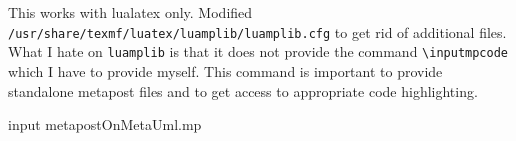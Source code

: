 \documentclass{article}
\newcommand*\inputmpcode[1]{\begin{mplibcode}input #1.mp\end{mplibcode}}
\begin{document}
This works with lualatex only. 
Modified \texttt{/usr/share/texmf/luatex/luamplib/luamplib.cfg} 
to get rid of additional files. 
What I hate on \texttt{luamplib} is that it does not provide the command 
\texttt{\textbackslash{}inputmpcode} which I have to provide myself. 
This command is important to provide standalone metapost files 
and to get access to appropriate code highlighting. 

\newcommand{\mytest}{\texttt{my newest test}}

\inputmpcode{metapostOnMetaUml}
\end{document}
